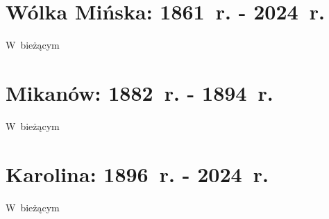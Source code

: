 \section{Wólka Mińska: 1861~r. - 2024~r.}

W~bieżącym



\section{Mikanów: 1882~r. - 1894~r.}

W~bieżącym



\section{Karolina: 1896~r. - 2024~r.}

W~bieżącym
